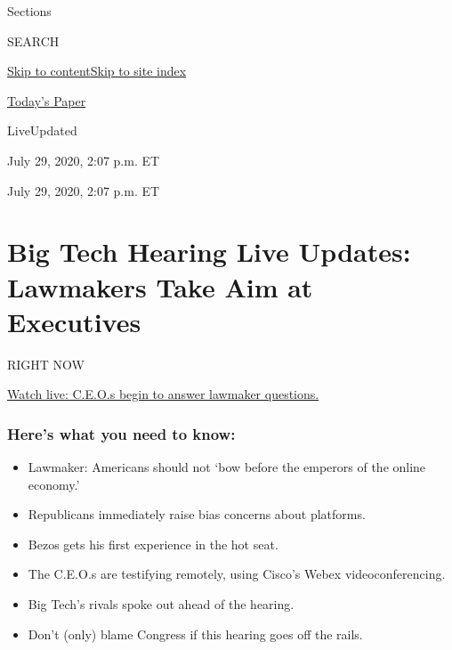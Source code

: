 Sections

SEARCH

\protect\hyperlink{site-content}{Skip to
content}\protect\hyperlink{site-index}{Skip to site index}

\href{https://myaccount.nytimes3xbfgragh.onion/auth/login?response_type=cookie\&client_id=vi}{}

\href{https://www.nytimes3xbfgragh.onion/section/todayspaper}{Today's
Paper}

LiveUpdated~

July 29, 2020, 2:07 p.m. ET

July 29, 2020, 2:07 p.m. ET

\hypertarget{big-tech-hearing-live-updates-lawmakers-take-aim-at-executives}{%
\section{Big Tech Hearing Live Updates: Lawmakers Take Aim at
Executives}\label{big-tech-hearing-live-updates-lawmakers-take-aim-at-executives}}

RIGHT NOW

\protect\hyperlink{watch-live-ceos-begin-to-answer-lawmaker-questions}{Watch
live: C.E.O.s begin to answer lawmaker questions.}

\hypertarget{heres-what-you-need-to-know}{%
\subsubsection{Here's what you need to
know:}\label{heres-what-you-need-to-know}}

\begin{itemize}
\item
  \protect\hyperlink{lawmaker-americans-should-not-bow-before-the-emperors-of-the-online-economy}{}

  Lawmaker: Americans should not `bow before the emperors of the online
  economy.'
\item
  \protect\hyperlink{republicans-immediately-raise-bias-concerns-about-platforms}{}

  Republicans immediately raise bias concerns about platforms.
\item
  \protect\hyperlink{bezos-gets-his-first-experience-in-the-hot-seat}{}

  Bezos gets his first experience in the hot seat.
\item
  \protect\hyperlink{the-ceos-are-testifying-remotely-using-ciscos-webex-videoconferencing}{}

  The C.E.O.s are testifying remotely, using Cisco's Webex
  videoconferencing.
\item
  \protect\hyperlink{big-techs-rivals-spoke-out-ahead-of-the-hearing}{}

  Big Tech's rivals spoke out ahead of the hearing.
\item
  \protect\hyperlink{dont-only-blame-congress-if-this-hearing-goes-off-the-rails}{}

  Don't (only) blame Congress if this hearing goes off the rails.
\end{itemize}

